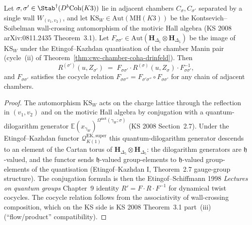 \begin{theorem}
\label{thm:cwc-ks-r-conjugation}
Let $\sigma,\sigma'\in\Stab^\dagger(D^b\mathrm{Coh}(K3))$ lie in
adjacent chambers $C_\sigma,C_{\sigma'}$ separated by a single wall
$W_{(v_1,v_2)}$, and let
$\mathrm{KS}_W\in\mathrm{Aut}(\mathrm{MH}(K3))$ be the
Kontsevich--Soibelman wall-crossing automorphism of the motivic Hall
algebra (KS 2008 \textup{arXiv:0811.2435} Theorem~3.1). Let
$F_{\sigma\sigma'}\in\mathrm{Aut}(\mathbf{H}_{\Delta_5}\otimes
\mathbf{H}_{\Delta_5})$ be the image of $\mathrm{KS}_W$ under the
Etingof--Kazhdan quantisation of the chamber Manin pair (cycle~(ii) of
Theorem~\ref{thm:cwc-chamber-coha-drinfeld}). Then
\[
 R^{(\sigma')}(u,Z_{\sigma'})
 \;=\;
 F_{\sigma\sigma'}\cdot R^{(\sigma)}(u,Z_\sigma)\cdot
 F_{\sigma\sigma'}^{-1},
\]
and $F_{\sigma\sigma'}$ satisfies the cocycle relation
$F_{\sigma\sigma''}=F_{\sigma'\sigma''}\circ F_{\sigma\sigma'}$ for any
chain of adjacent chambers.
\end{theorem}

\begin{proof}
The automorphism $\mathrm{KS}_W$ acts on the charge lattice through the
reflection in $(v_1,v_2)$ and on the motivic Hall algebra by conjugation
with a quantum-dilogarithm generator
$\mathbb{E}(x_{\gamma_W})^{\Omega^{\mathrm{mot}}(\gamma_W;\sigma)}$
(KS 2008 Section~2.7). Under the Etingof--Kazhdan functor
$\mathcal{Q}^{\mathrm{EK,super}}_{K(1)}$ this quantum-dilogarithm
generator descends to an element of the Cartan torus of
$\mathbf{H}_{\Delta_5}\otimes\mathbf{H}_{\Delta_5}$: the dilogarithm
generators are $\mathfrak{h}$-valued, and the functor sends
$\mathfrak{h}$-valued group-elements to
$\mathfrak{h}$-valued group-elements of the quantisation
(Etingof--Kazhdan I, Theorem~2.7 gauge-group structure). The conjugation
formula is then the Etingof--Schiffmann 1998 \emph{Lectures on quantum
groups} Chapter~9 identity
$R'=F\cdot R\cdot F^{-1}$ for dynamical twist cocycles. The cocycle
relation follows from the associativity of wall-crossing composition,
which on the KS side is KS 2008 Theorem~3.1 part~(iii)
(``flow/product'' compatibility).
\end{proof}

